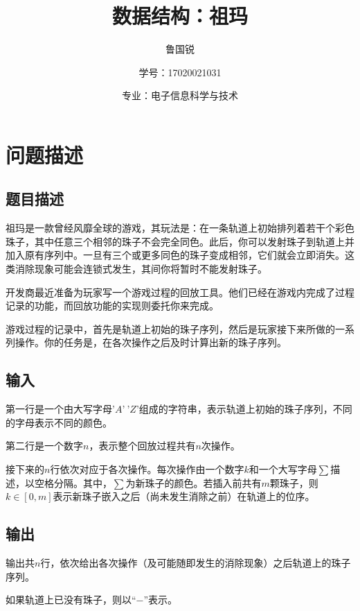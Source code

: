 \documentclass[UTF8]{ctexart}
\title{数据结构：祖玛}
\author{鲁国锐 \protect\newline
\and 学号：17020021031 \\
\and 专业：电子信息科学与技术}
\begin{document}
	\maketitle
	\renewcommand{\contentsname}{Contents}
	\tableofcontents
	\newpage
	
	\hypersetup{
	bookmarks=true,
	colorlinks=true,
	linkcolor=red,
	urlcolor=blue
	}
	\section{问题描述}
	\subsection{题目描述}
	\indent 祖玛是一款曾经风靡全球的游戏，其玩法是：在一条轨道上初始排列着若干个彩色珠子，其中任意三个相邻的珠子不会完全同色。此后，你可以发射珠子到轨道上并加入原有序列中。一旦有三个或更多同色的珠子变成相邻，它们就会立即消失。这类消除现象可能会连锁式发生，其间你将暂时不能发射珠子。

\indent 开发商最近准备为玩家写一个游戏过程的回放工具。他们已经在游戏内完成了过程记录的功能，而回放功能的实现则委托你来完成。

\indent 游戏过程的记录中，首先是轨道上初始的珠子序列，然后是玩家接下来所做的一系列操作。你的任务是，在各次操作之后及时计算出新的珠子序列。
	\subsection{输入}
	\indent 第一行是一个由大写字母$’A’~’Z’$组成的字符串，表示轨道上初始的珠子序列，不同的字母表示不同的颜色。

\indent 第二行是一个数字$n$，表示整个回放过程共有$n$次操作。

\indent 接下来的$n$行依次对应于各次操作。每次操作由一个数字$k$和一个大写字母$\sum$描述，以空格分隔。其中，$\sum$为新珠子的颜色。若插入前共有$m$颗珠子，则$k\in[0, m]$表示新珠子嵌入之后（尚未发生消除之前）在轨道上的位序。
	\subsection{输出}
	\indent 输出共$n$行，依次给出各次操作（及可能随即发生的消除现象）之后轨道上的珠子序列。

\indent 如果轨道上已没有珠子，则以“$-$”表示。
\end{document}
